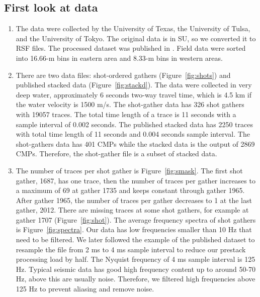 \subsection{First look at data}

\begin{enumerate}

\item The data were collected by the University of Texas, the University of Tulsa, and the University of Tokyo. The original data is in SU, so we converted it to RSF files. The processed dataset was published in \cite{Moore}. Field data were sorted into 16.66-m bins in eastern area and 8.33-m bins in western areas.   

\item There are two data files: shot-ordered gathers (Figure~\ref{fig:shots}) and published stacked data (Figure~\ref{fig:stackd}). The data were collected in very deep water, approximately 6 seconds two-way travel time, which is 4.5 km if the water velocity is 1500 m/s. The shot-gather data has 326 shot gathers with 19057 traces. The total time length of a trace is 11 seconds with a sample interval of 0.002 seconds. The published stacked data has 2250 traces with total time length of 11 seconds and 0.004 seconds sample interval. The shot-gathers data has 401 CMPs while the stacked data is the output of 2869 CMPs. Therefore, the shot-gather file is a subset of stacked data.  

\item The number of traces per shot gather is Figure~\ref{fig:smask}. The first shot gather, 1687, has one trace, then the number of traces per gather increases to a maximum of 69 at gather 1735 and keeps constant through gather 1965. After gather 1965, the number of traces per gather decreases to 1 at the last gather, 2012. There are missing traces at some shot gathers, for example at gather 1707 (Figure~\ref{fig:shot}). The average frequency spectra of shot gathers is Figure~\ref{fig:spectra}. Our data has low frequencies smaller than 10 Hz that need to be filtered. We later followed the example of the published dataset \cite[]{Moore} to resample the file from 2 ms to 4 ms sample interval to reduce our prestack processing load by half. The Nyquist frequency of 4 ms sample interval is 125 Hz. Typical seismic data has good high frequency content up to around 50-70 Hz, above this are usually noise. Therefore, we filtered high frequencies above 125 Hz to prevent aliasing and remove noise.    


\end{enumerate}\clearpage

